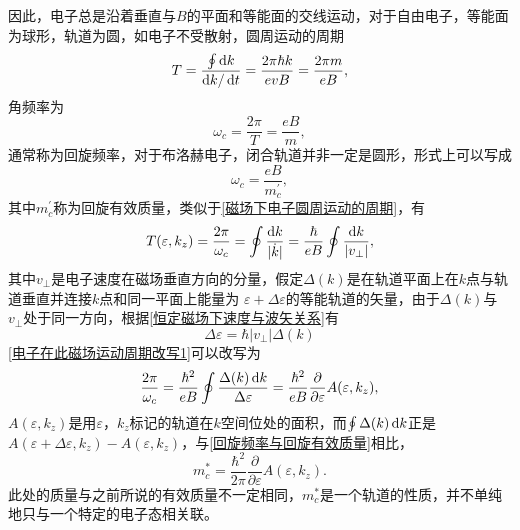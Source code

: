             因此，电子总是沿着垂直与$B$的平面和等能面的交线运动，对于自由电子，等能面为球形，轨道为圆，如电子不受散射，圆周运动的周期
            \begin{equation}
                T=\frac{\oint\mathop{}\!\mathrm{d} k}{\mathop{}\!\mathrm{d} k/\mathop{}\!\mathrm{d} t}=\frac{2\pi\hbar k}{evB}=\frac{2\pi m}{eB}\label{磁场下电子圆周运动的周期},
            \end{equation}
            角频率为
            \begin{equation}
                \omega_c=\frac{2\pi}{T}=\frac{eB}{m},
            \end{equation}
            通常称为回旋频率，对于布洛赫电子，闭合轨道并非一定是圆形，形式上可以写成
            \begin{equation}
                \omega_c=\frac{eB}{m^\prime_c}\label{回旋频率与回旋有效质量},
            \end{equation}
            其中$m^\prime_c$称为回旋有效质量，类似于\autoref{磁场下电子圆周运动的周期}，有
            \begin{equation}
                T(\varepsilon,k_z)=\frac{2\pi}{\omega_c}=\oint\frac{\mathop{}\!\mathrm{d} k}{|\dot{k}|}=\frac{\hbar}{eB}\oint\frac{\mathop{}\!\mathrm{d} k}{|v_\perp|}\label{电子在此磁场运动周期改写1},
            \end{equation}
            其中$v_\perp$是电子速度在磁场垂直方向的分量，假定$\Delta (k)$是在轨道平面上在$k$点与轨道垂直并连接$k$点和同一平面上能量为
            $\varepsilon+\Delta\varepsilon$的等能轨道的矢量，由于$\Delta (k)$与$v_\perp$处于同一方向，根据\autoref{恒定磁场下速度与波矢关系}有
            \begin{equation}
                \Delta \varepsilon=\hbar|v_\perp|\Delta(k)
            \end{equation}
            \autoref{电子在此磁场运动周期改写1}可以改写为
            \begin{equation}
                \frac{2\pi}{\omega_c}=\frac{\hbar^2}{eB}\oint\frac{\Delta(k)\mathop{}\!\mathrm{d} k}{\Delta\varepsilon}=\frac{\hbar^2}{eB}\frac{\partial}{\partial\varepsilon}A(\varepsilon,k_z),
            \end{equation}
            $A(\varepsilon,k_z)$是用$\varepsilon$，$k_z$标记的轨道在$k$空间位处的面积，而$\oint\Delta(k)\mathop{}\!\mathrm{d} k$正是
            $A(\varepsilon+\Delta\varepsilon,k_z)-A(\varepsilon,k_z)$，与\autoref{回旋频率与回旋有效质量}相比，
            \begin{equation}
                m_c^*=\frac{\hbar^2}{2\pi}\frac{\partial}{\partial\varepsilon}A(\varepsilon,k_z).
            \end{equation}
            此处的质量与之前所说的有效质量不一定相同，$m^*_c$是一个轨道的性质，并不单纯地只与一个特定的电子态相关联。

